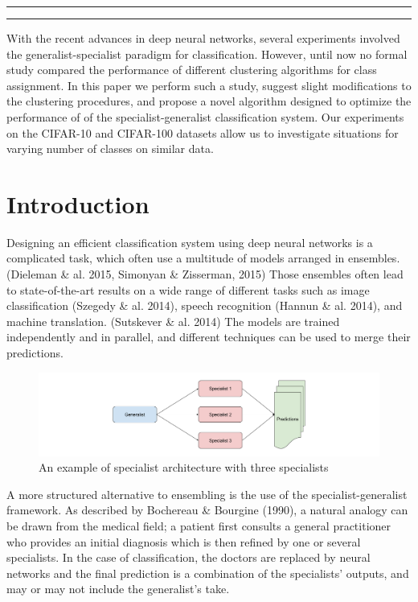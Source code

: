 \documentclass[12pt]{article}
\makeatletter
\def\maketitle{
    \begin{centering}
    \par\rule{\textwidth}{2pt}
    \par\hfill
    \par\textbf{\LARGE\@title}
    \par\hfill
    \par{\textit{\@author}}
    \par\hfill
    \par{\@date}
    \par\rule{\textwidth}{2pt}
    \end{centering}
}
\makeatother
\begin{document}
\thispagestyle{empty}
\maketitle
\hfill
\abstract
With the recent advances in deep neural networks, several experiments
involved the generalist-specialist paradigm for classification. However,
until now no formal study compared the performance of different
clustering algorithms for class assignment. In this paper we perform
such a study, suggest slight modifications to the clustering procedures,
and propose a novel algorithm designed to optimize the performance of of
the specialist-generalist classification system. Our experiments on the
CIFAR-10 and CIFAR-100 datasets allow us to investigate situations for
varying number of classes on similar data.

\section{Introduction}\label{introduction}

Designing an efficient classification system using deep neural networks
is a complicated task, which often use a multitude of models arranged in
ensembles. (Dieleman \& al. 2015, Simonyan \& Zisserman, 2015) Those
ensembles often lead to state-of-the-art results on a wide range of
different tasks such as image classification (Szegedy \& al. 2014),
speech recognition (Hannun \& al. 2014), and machine translation.
(Sutskever \& al. 2014) The models are trained independently and in
parallel, and different techniques can be used to merge their
predictions.

\begin{figure}[htbp]
\centering
\includegraphics{./figs/specialists.png}
\caption{An example of specialist architecture with three specialists}
\end{figure}

A more structured alternative to ensembling is the use of the
specialist-generalist framework. As described by Bochereau \& Bourgine
(1990), a natural analogy can be drawn from the medical field; a patient
first consults a general practitioner who provides an initial diagnosis
which is then refined by one or several specialists. In the case of
classification, the doctors are replaced by neural networks and the
final prediction is a combination of the specialists' outputs, and may
or may not include the generalist's take.
\end{document}
